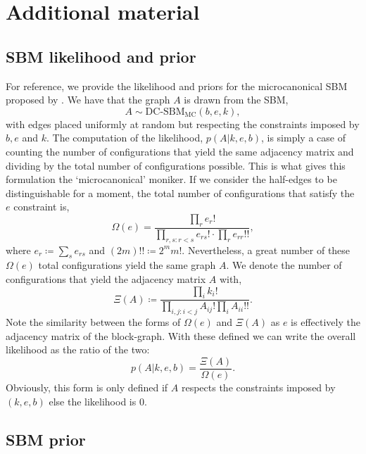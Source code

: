 \section{Additional material}

\subsection{SBM likelihood and prior}
\label{appdx:sbm-likelihood}

For reference, we provide the likelihood and priors for the microcanonical SBM proposed by \citet{Peixoto-Bayesian-Microcanonical}. We have that the graph $A$ is drawn from the SBM,
%
\begin{equation}
	A \sim \textrm{DC-SBM}_{\textrm{MC}}(b, e, k),
\end{equation}
%
with edges placed uniformly at random but respecting the constraints imposed by $b, e$ and $k$. The computation of the likelihood, $p(A|k, e, b)$, is simply a case of counting the number of configurations that yield the same adjacency matrix and dividing by the total number of configurations possible. This is what gives this formulation the `microcanonical' moniker. If we consider the half-edges to be distinguishable for a moment, the total number of configurations that satisfy the $e$ constraint is,
%
\begin{equation}
	\Omega(e) = \frac{\prod_{r} e_r !}{\prod_{r,s : r < s} e_{rs}! \cdot \prod_{r} e_{rr}!!},
\end{equation}
%
where $e_r \coloneqq \sum_{s} e_{rs}$ and $(2m)!! \coloneqq 2^m m!$. Nevertheless, a great number of these $\Omega(e)$ total configurations yield the same graph $A$. We denote the number of configurations that yield the adjacency matrix $A$ with,
%
\begin{equation}
	\Xi(A) \coloneqq \frac{\prod_i k_i !}{\prod_{i,j : i < j} A_{ij} ! \prod_i A_{ii} !! }.
\end{equation}
%
Note the similarity between the forms of $\Omega(e)$ and $\Xi(A)$ as $e$ is effectively the adjacency matrix of the block-graph. With these defined we can write the overall likelihood as the ratio of the two:
%
\begin{equation}
	p(A|k,e,b) = \frac{\Xi(A)}{\Omega(e)}.
\end{equation}
%
Obviously, this form is only defined if $A$ respects the constraints imposed by $(k,e,b)$ else the likelihood is 0.

\subsection{SBM prior}
\label{appdx:sbm-prior}


